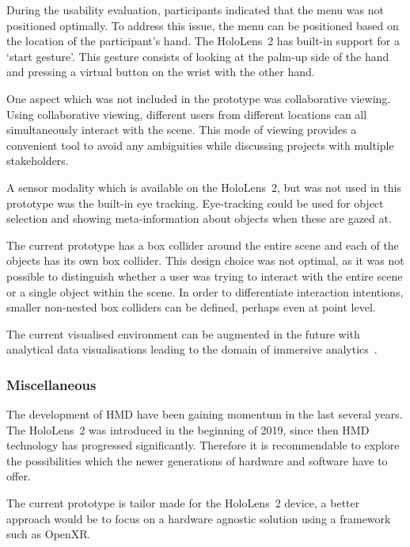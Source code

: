During the usability evaluation, participants indicated that the menu was not positioned optimally. To address this issue, the menu can be positioned based on the location of the participant's hand. The HoloLens~2 has built-in support for a `start gesture'. This gesture consists of looking at the palm-up side of the hand and pressing a virtual button on the wrist with the other hand.

One aspect which was not included in the prototype was collaborative viewing. Using collaborative viewing, different users from different locations can all simultaneously interact with the scene. This mode of viewing provides a convenient tool to avoid any ambiguities while discussing projects with multiple stakeholders.

A sensor modality which is available on the HoloLens~2, but was not used in this prototype was the built-in eye tracking. Eye-tracking could be used for object selection and showing meta-information about objects when these are gazed at.

The current prototype has a box collider around the entire scene and each of the objects has its own box collider. This  design choice was not optimal, as it was not possible to distinguish whether a user was trying to interact with the entire scene or a single object within the scene. In order to differentiate interaction intentions, smaller non-nested box colliders can be defined, perhaps even at point level.

The current visualised environment can be augmented in the future with analytical data visualisations leading to the domain of immersive analytics~\cite{Ens21}.

\subsubsection{Miscellaneous}
The development of HMD have been gaining momentum in the last several years. The HoloLens~2 was introduced in the beginning of 2019, since then HMD technology has progressed significantly. Therefore it is recommendable to explore the possibilities which the newer generations of hardware and software have to offer.

The current prototype is tailor made for the HoloLens~2 device, a better approach would be to focus on a hardware agnostic solution using a framework such as OpenXR.

